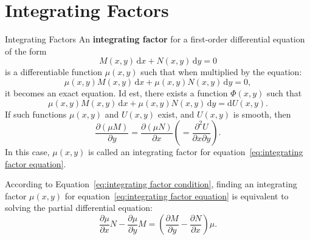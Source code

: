 \documentclass[11pt]{../../TexTemplate/elegantbook}
\begin{document}
\section{Integrating Factors}
\begin{definition}{Integrating Factors}
    An \textbf{integrating factor} for a first-order differential equation of the form
    \begin{equation}\label{eq:integrating factor equation}
        M(x, y) \, \mathrm{d}x + N(x, y) \, \mathrm{d}y = 0
    \end{equation}
    is a differentiable function \(\mu(x, y)\) such that when multiplied by the equation:
    \[
    \mu(x, y) M(x, y) \, \mathrm{d}x + \mu(x, y) N(x, y) \, \mathrm{d}y = 0,
    \]
    it becomes an exact equation.
    Id est, there exists a function \(\Phi(x, y)\) such that
    \[
    \mu(x, y) M(x, y) \, \mathrm{d}x + \mu(x, y) N(x, y) \, \mathrm{d}y = \mathrm{d}U(x, y).
    \]
    If such functions \(\mu(x, y)\) and \(U(x, y)\) exist, and \(U(x, y)\) is smooth, then
    \begin{equation}\label{eq:integrating factor condition}
        \frac{\partial(\mu M)}{\partial y} = \frac{\partial(\mu N)}{\partial x}
        \left( = \frac{\partial^2 U}{\partial x \partial y} \right).
    \end{equation}
    In this case, \(\mu(x, y)\) is called an integrating factor for equation~\eqref{eq:integrating factor equation}.
\end{definition}
According to Equation~\eqref{eq:integrating factor condition}, 
finding an integrating factor \(\mu(x, y)\) for equation~\eqref{eq:integrating factor equation}
is equivalent to solving the partial differential equation:
\begin{equation}\label{eq:integrating factor PDE}
    \frac{\partial \mu}{\partial x} N - \frac{\partial \mu}{\partial y} M 
    = \left( \frac{\partial M}{\partial y} - \frac{\partial N}{\partial x} \right) \mu.
\end{equation}
\end{document}
